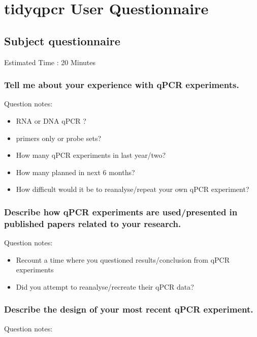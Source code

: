 \documentclass[../main.tex]{subfiles}
\begin{document}
\section{tidyqpcr User Questionnaire}
\subsection{Subject questionnaire}
Estimated Time : 20 Minutes

\subsubsection{Tell me about your experience with qPCR experiments.}

Question notes:
\begin{itemize}
    \item RNA or DNA qPCR ?
    \item primers only or probe sets?
    \item How many qPCR experiments in last year/two?
    \item How many planned in next 6 months?
    \item How difficult would it be to reanalyse/repeat your own qPCR experiment?
\end{itemize}

\subsubsection{Describe how qPCR experiments are used/presented in published papers related to your research.}

Question notes:
\begin{itemize}
    \item Recount a time where you questioned results/conclusion from qPCR experiments
    \item Did you attempt to reanalyse/recreate their qPCR data?
\end{itemize}

\subsubsection{Describe the design of your most recent qPCR experiment.}

Question notes:
\end{document}
